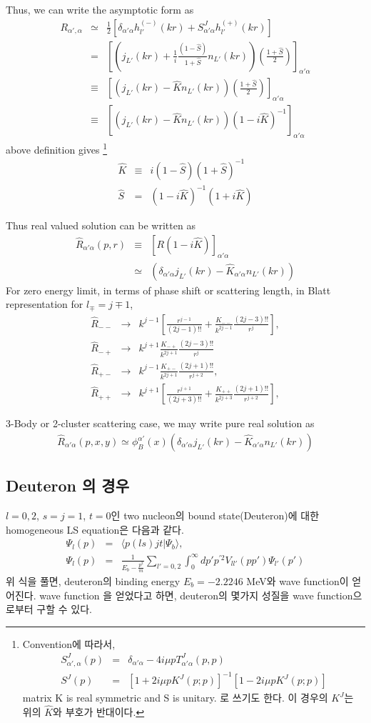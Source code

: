 \documentclass[10pt]{book}
\newcommand{\bea}{\begin{eqnarray}}
\newcommand{\eea}{\end{eqnarray}}
\newcommand{\no}{\nonumber \\}
\def\la{\langle}
\def\ra{\rangle}
\begin{document}
Thus, we can write the asymptotic form as
\bea
R_{\alpha',\alpha}&\simeq&
      \frac{1}{2}[\delta_{\alpha'\alpha}h^{(-)}_{l'}(kr)
                  +S^J_{\alpha'\alpha}h^{(+)}_{l'}(kr)]\no
          &=&
          \left[
          (j_{L'}(kr)+\frac{1}{i}\frac{(1-\hat{S})}{1+\hat{S}}n_{L'}(kr))             
          \left(\frac{1+\hat{S}}{2}\right)\right]_{\alpha'\alpha}\no
          &\equiv&
          \left[
          (j_{L'}(kr)-\hat{K}n_{L'}(kr))             
          \left(\frac{1+\hat{S}}{2}\right)\right]_{\alpha'\alpha}\no
          &\equiv&
          \left[
          (j_{L'}(kr)-\hat{K}n_{L'}(kr))             
          (1-i\hat{K})^{-1}\right]_{\alpha'\alpha}
\eea
above definition gives
\footnote{
Convention에 따라서,
\bea
S^{J}_{\alpha',\alpha}(p)
&=&\delta_{\alpha'\alpha}-4i\mu p T^J_{\alpha'\alpha}(p,p)\no
S^J(p)&=&[1+2i \mu p K^J(p;p)]^{-1}[1-2i\mu p K^J(p;p)]
\eea
matrix K is real symmetric and S is unitary.
로 쓰기도 한다.
이 경우의 $K^J$는 위의 $\hat{K}$와 부호가 반대이다.
}
\bea
\hat{K}&\equiv& i(1-\hat{S})(1+\hat{S})^{-1}\no
\hat{S}&=&(1-i\hat{K})^{-1}(1+i\hat{K})
\eea

Thus real valued solution can be written as
\bea
\hat{R}_{\alpha'\alpha}(p,r)&\equiv&
 \left[R(1-i\hat{K})\right]_{\alpha'\alpha}\no
 &\simeq& 
 \left(\delta_{\alpha'\alpha}j_{L'}(kr)-\hat{K}_{\alpha'\alpha}n_{L'}(kr)\right)
\eea
For zero energy limit, in terms of phase shift or scattering length,
in Blatt representation for $l_{\mp}=j\mp 1$,
\bea
\hat{R}_{--}&\to& k^{j-1}[\frac{r^{j-1}}{(2j-1)!!}
                         +\frac{K_{--}}{k^{2j-1}}
                         \frac{(2j-3)!!}{r^{j}} ],\no
\hat{R}_{-+}&\to& k^{j+1}\frac{K_{-+}}{k^{2j+1}}
                  \frac{(2j-3)!!}{r^j}\no
\hat{R}_{+-}&\to& k^{j-1}\frac{K_{+-}}{k^{2j+1}}
                  \frac{(2j+1)!!}{r^{j+2}},\no
\hat{R}_{++}&\to& k^{j+1}[\frac{r^{j+1}}{(2j+3)!!}
                         +\frac{K_{++}}{k^{2j+3}}
                         \frac{(2j+1)!!}{r^{j+2}} ],
\eea


3-Body or 2-cluster scattering case,
we may write pure real solution as 
\bea
\hat{R}_{\alpha'\alpha}(p,x,y)\simeq
\phi^{\alpha'}_B(x)\left(\delta_{\alpha'\alpha}j_{L'}(kr)-\hat{K}_{\alpha'\alpha}n_{L'}(kr)\right)
\eea

\subsection{Deuteron 의 경우}
$l=0,2$, $s=j=1$, $t=0$인 two nucleon의 bound state(Deuteron)에 대한 
homogeneous LS equation은 다음과 같다.
\bea
\Psi_l(p)&=&\la p(ls) j t|\Psi_b\ra,\no
\Psi_l(p)&=&\frac{1}{E_b-\frac{p^2}{m}}\sum_{l'=0,2}\int_0^\infty dp' p^{'2} V_{ll'}(pp')\Psi_{l'}(p')
\eea
위 식을 풀면, deuteron의 binding energy $E_b=-2.2246$ MeV와 wave function이 얻어진다.
wave function 을 얻었다고 하면, deuteron의 몇가지 성질을 wave function으로부터 구할 수 있다.
\end{document}
